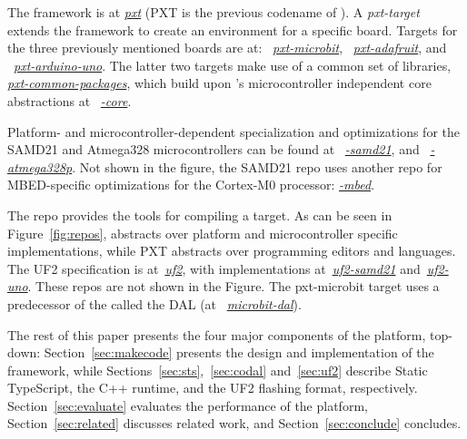 The \MC framework
is at \emph{\href{https://github.com/microsoft/pxt}{pxt}} (PXT is the previous codename of \MCN).
A \emph{pxt-target} extends the framework to create an environment for a specific board. Targets
for the three previously mentioned boards are at:
~\emph{\href{https://github.com/microsoft/pxt-microbit}{pxt-microbit}},
~\emph{\href{https://github.com/microsoft/pxt-adafruit}{pxt-adafruit}}, and
~\emph{\href{https://github.com/microsoft/pxt-arduino-uno}{pxt-arduino-uno}}.
The latter two targets make use of a common set of libraries,
\emph{\href{https://github.com/microsoft/pxt-common-packages}{pxt-common-packages}},
which build upon \CON's microcontroller independent core abstractions at
~\emph{\href{https://github.com/lancaster-university/\CO-core}{\COLN-core}}.

Platform- and microcontroller-dependent specialization and optimizations for
the SAMD21 and Atmega328 microcontrollers can be found at
~\emph{\href{https://github.com/lancaster-university/codal-samd21}{\COLN-samd21}},
and
~\emph{\href{https://github.com/lancaster-university/codal-atmega328p}{\COLN-atmega328p}}.
Not shown in the figure, the SAMD21 repo uses another repo for
MBED-specific optimizations for the Cortex-M0 processor: \emph{\href{https://github.com/lancaster-university/codal-mbed}{\COLN-mbed}}.

The repo \emph{\href{https://github.com/lancaster-university/codal}{\COLN}} provides the
tools for compiling a \CO target.  As can be seen in Figure~\ref{fig:repos},
\CO abstracts over platform and microcontroller specific
implementations, while PXT abstracts over programming editors and languages.
The UF2 specification is at~\emph{\href{https://github.com/microsoft/uf2}{uf2}},
with implementations at~\emph{\href{https://github.com/microsoft/uf2-samd21}{uf2-samd21}}
and~\emph{\href{https://github.com/mmoskal/uf2-uno}{uf2-uno}}. These repos are not
shown in the Figure.
The pxt-microbit target uses a predecessor of the \CO called the DAL (at
~\emph{\href{https://github.com/lancaster-university/microbit-dal}{microbit-dal}}).

The rest of this paper presents the four major components of the platform,
top-down: Section~\ref{sec:makecode} presents the design
and implementation of the \MC framework, while
Sections~\ref{sec:sts},~\ref{sec:codal} and~\ref{sec:uf2} describe Static TypeScript,
the \CO C++ runtime, and the UF2 flashing format, respectively.
Section~\ref{sec:evaluate} evaluates the performance of the platform,
Section~\ref{sec:related} discusses related work, and Section~\ref{sec:conclude}
concludes.
